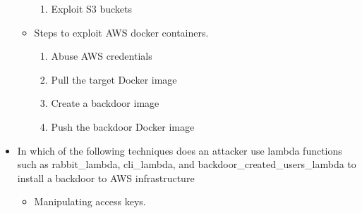 \begin{itemize}
\begin{itemize}
\begin{enumerate}
            \item Exploit S3 buckets
        \end{enumerate}
        \item Steps to exploit AWS docker containers.
        \begin{enumerate}
            \item Abuse AWS credentials
            \item Pull the target Docker image
            \item Create a backdoor image
            \item Push the backdoor Docker image
        \end{enumerate}
    \end{itemize}
    \item In which of the following techniques does an attacker use lambda functions such as rabbit\_lambda, cli\_lambda, and backdoor\_created\_users\_lambda to install a backdoor to AWS infrastructure
    \begin{itemize}
        \item Manipulating access keys.
    \end{itemize}
\end{itemize}
